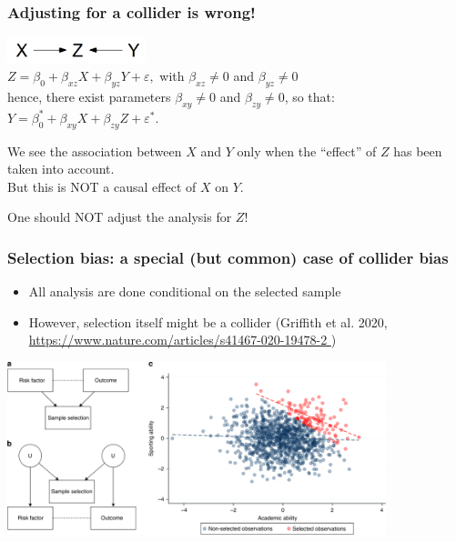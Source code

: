 \documentclass[10pt,dvipsnames,t,handout%
,aspectratio=169%
]{beamer}%
\begin{document}
\begin{frame}
\frametitle{Adjusting for a \alert{collider} is wrong!}
\includegraphics[width=4cm]{collider}\\[0.3cm]

$Z = \beta_0 +  \beta_{xz} X + \beta_{yz} Y + \varepsilon,$ with $\beta_{xz}\ne 0$ and $\beta_{yz}\ne 0$ \\[0.2cm]
hence, there exist parameters 
$\beta_{xy}\ne 0$ and $\beta_{zy}\ne 0$, so that: \\
$Y = \beta^*_0 +  \beta_{xy} X + \beta_{zy} Z + \varepsilon^*. $\\[0.2cm]

 
\pause
\begin{block}{ }
We see the association between $X$ and $Y$ only when the ``effect'' of  $Z$ has been taken into account. \\
\alert{But this is NOT a causal effect of $X$ on $Y$.} 
\end{block}

\alert<2>{One should NOT adjust the analysis for $Z$!}
\end{frame}

\begin{frame}
	\frametitle{\alert{Selection bias:} a special (but common) case of collider bias}
\begin{itemize}
	\item All analysis are done conditional on the selected sample
	\item However, selection itself might be a collider (Griffith et al. 2020, \href{https://www.nature.com/articles/s41467-020-19478-2
	}{https://www.nature.com/articles/s41467-020-19478-2
} ) \\[0.3cm]
\end{itemize}	

\includegraphics[width=11cm]{us_univ}

\end{frame}
\end{document}
